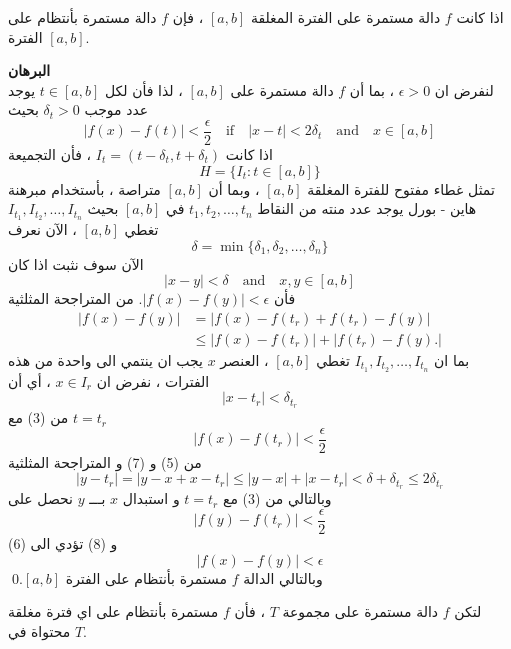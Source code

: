 \begin{theorem}
	اذا كانت $f$ دالة مستمرة على الفترة المغلقة  $[a, b]$ ، فإن $f$ دالة مستمرة بأنتظام على الفترة $[a, b]$.
\end{theorem}
\noindent
\textbf{البرهان}\\
\noindent
لنفرض ان $\epsilon > 0 $ ، بما أن $f$ دالة مستمرة على $[a, b]$ ، لذا فأن لكل $t\in [a, b]$ يوجد عدد موجب $\delta_t > 0 $ بحيث
\begin{equation}
	|f(x) - f(t) | < \frac{\epsilon}{2}  \quad\text{if}\quad |x-t| < 2\delta_t \quad\text{and}\quad x \in [a, b]
 \end{equation}
 اذا كانت $I_t = (t-\delta_t, t+\delta_t)$ ، فأن التجميعة
 \[
 H = \{I_t : t\in [a, b]\}
 \]
 تمثل غطاء مفتوح للفترة المغلقة $[a, b]$ ، وبما أن $[a, b]$ متراصة ، بأستخدام مبرهنة هاين - بورل يوجد عدد منته من النقاط $t_1, t_2,\dots, t_n$ في $[a, b]$ بحيث $I_{t_1}, I_{t_2}, \dots, I_{t_n} $ تغطي $[a, b]$ ، الآن نعرف 
\begin{equation}
	 \delta = \min \{\delta_1, \delta_2, \dots, \delta_n\}
\end{equation}
 الآن سوف نثبت اذا كان 
 \begin{equation}
 	| x - y| < \delta \quad\text{and}\quad  x, y\in [a, b]
 \end{equation}
 فأن $|f(x) - f(y)| < \epsilon$. من المتراجحة المثلثية
 \begin{equation}
 	\begin{aligned}
 		|f(x) - f(y)| &= |f(x) - f(t_r) + f(t_r) - f(y)|\\
 		&\leq |f(x) - f(t_r) | + |f(t_r) - f(y).|
 	\end{aligned}
 \end{equation}
 بما ان  $I_{t_1}, I_{t_2}, \dots, I_{t_n} $ تغطي $[a, b]$ ، العنصر $x$ يجب ان ينتمي الى واحدة من هذه الفترات ، نفرض ان $x\in I_r$ ، أي أن
 \begin{equation}
 	|x-t_r| < \delta_{t_r}
 \end{equation}
من (3) مع $t=t_r$ 
\begin{equation}
	|f(x) - f(t_r)| < \frac{\epsilon}{2}
\end{equation}
من (5) و (7) و المتراجحة المثلثية
\[
|y-t_r| = |y-x + x -t_r| \leq |y-x| + |x-t_r| < \delta + \delta_{t_r} \leq 2\delta_{t_r}
\]
وبالتالي من (3) مع $t=t_r$ و استبدال $x$ بـــ $y$ نحصل على 
\[
|f(y) - f(t_r)| < \frac{\epsilon}{2}
\]
(6) و (8) تؤدي الى 
$$|f(x) - f(y)| < \epsilon$$
وبالتالي الدالة $f$ مستمرة بأنتظام على الفترة $[a, b]$.\qed

\begin{corollary}
	لتكن $f$ دالة مستمرة على مجموعة $T$ ، فأن $f$ مستمرة بأنتظام على اي فترة مغلقة محتواة في $T$.
\end{corollary}


